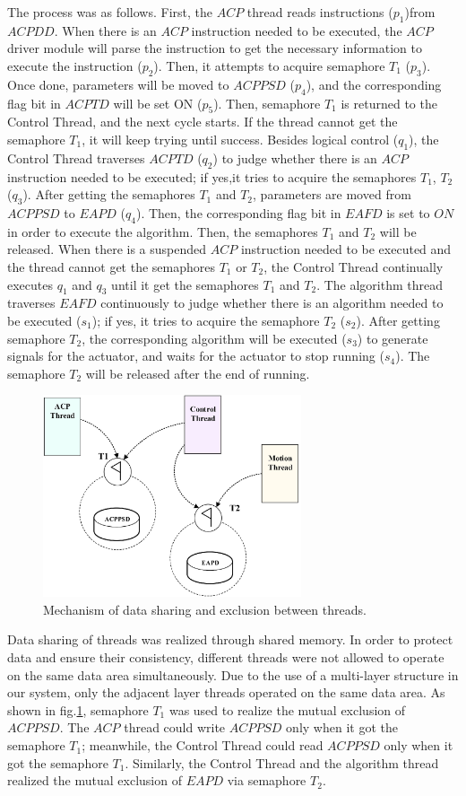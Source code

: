 \documentclass[journal]{IEEEtran}
\begin{document}
The process was as follows. First, the $ACP$ thread reads instructions ($p_1$)from $ACPDD$. When there is an $ACP$ instruction needed to be executed, the $ACP$ driver module will parse the instruction to get the necessary information to execute the instruction ($p_2$). Then, it attempts to acquire semaphore $T_1$ ($p_3$). Once done, parameters will be moved to $ACPPSD$ ($p_4$), and the corresponding flag bit in $ACPTD$ will be set ON ($p_5$). Then, semaphore $T_1$ is returned to the Control Thread, and the next cycle starts. If the thread cannot get the semaphore $T_1$, it will keep trying until success.
Besides logical control ($q_1$), the Control Thread traverses $ACPTD$ ($q_2$) to judge whether there is an $ACP$ instruction needed to be executed; if yes,it tries to acquire the semaphores $T_1$, $T_2$ ($q_3$). After getting the semaphores $T_1$ and $T_2$, parameters are moved from $ACPPSD$ to $EAPD$ ($q_4$). Then, the corresponding flag bit in $EAFD$ is set to $ON$ in order to execute the algorithm. Then, the semaphores $T_1$ and $T_2$ will be released. When there is a suspended $ACP$ instruction needed to be executed and the thread cannot get the semaphores $T_1$ or $T_2$, the Control Thread continually executes $q_1$ and $q_3$ until it get the semaphores $T_1$ and $T_2$.
The algorithm thread traverses $EAFD$ continuously to judge whether there is an algorithm needed to be executed ($s_1$); if yes, it tries to acquire the semaphore $T_2$ ($s_2$). After getting semaphore $T_2$, the corresponding algorithm will be executed ($s_3$) to generate signals for the actuator, and waits for the actuator to stop running ($s_4$). The semaphore $T_2$ will be released after the end of running.
\begin{figure}
\centering
\includegraphics[width=3in]{fig/FIG13_TII-18-0024.eps}
\caption{Mechanism of data sharing and exclusion between threads.}
\label{fig:datasharing}
\end{figure}
Data sharing of threads was realized through shared memory. In order to protect data and ensure their consistency, different threads were not allowed to operate on the same data area simultaneously. Due to the use of a multi-layer structure in our system, only the adjacent layer threads operated on the same data area. As shown in fig.\ref{fig:datasharing}, semaphore $T_1$ was used to realize the mutual exclusion of $ACPPSD$. The $ACP$ thread could write $ACPPSD$ only when it got the semaphore $T_1$; meanwhile, the Control Thread could read $ACPPSD$ only when it got the semaphore $T_1$. Similarly, the Control Thread and the algorithm thread realized the mutual exclusion of $EAPD$ via semaphore $T_2$.
\end{document}
